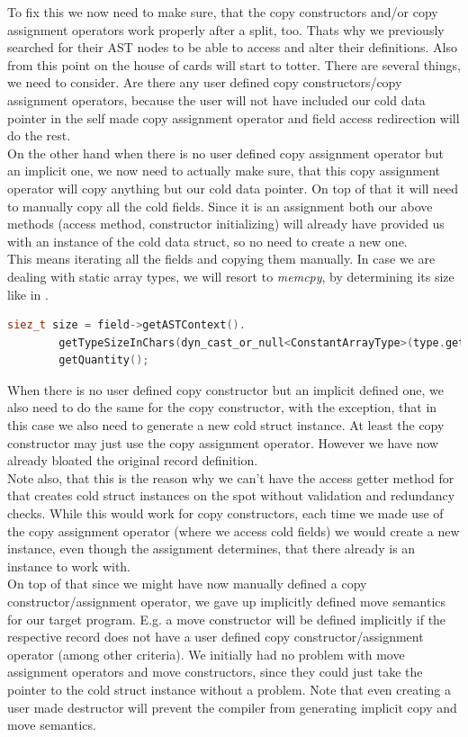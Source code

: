 To fix this we now need to make sure, that the copy constructors and/or copy assignment operators work properly after a split, too. Thats why we previously searched for their AST nodes to be able to access and alter their definitions. Also from this point on the house of cards will start to totter. There are several things, we need to consider. Are there any user defined copy constructors/copy assignment operators, because the user will not have included our cold data pointer in the self made copy assignment operator and field access redirection will do the rest.\\
On the other hand when there is no user defined copy assignment operator but an implicit one, we now need to actually make sure, that this copy assignment operator will copy anything but our cold data pointer. On top of that it will need to manually copy all the cold fields. Since it is an assignment both our above methods (access method, constructor initializing) will already have provided us with an instance of the cold data struct, so no need to create a new one.\\
This means iterating all the fields and copying them manually. In case we are dealing with static array types, we will resort to \textit{memcpy}, by determining its size like in .
\begin{lstlisting}[language=C++, name={Retrieving the size of a static array type through its AST node.}, label={memcpy_quant}]
	siez_t size = field->getASTContext().
		getTypeSizeInChars(dyn_cast_or_null<ConstantArrayType>(type.getTypePtr())).
		getQuantity();
\end{lstlisting}
When there is no user defined copy constructor but an implicit defined one, we also need to do the same for the copy constructor, with the exception, that in this case we also need to generate a new cold struct instance. At least the copy constructor may just use the copy assignment operator. However we have now already bloated the original record definition.\\
Note also, that this is the reason why we can't have the access getter method for that creates cold struct instances on the spot without validation and redundancy checks. While this would work for copy constructors, each time we made use of the copy assignment operator (where we access cold fields) we would create a new instance, even though the assignment determines, that there already is an instance to work with.\\
On top of that since we might have now manually defined a copy constructor/assignment operator, we gave up implicitly defined move semantics for our target program. E.g. a move constructor will be defined implicitly if the respective record does not have a user defined copy constructor/assignment operator  (among other criteria). We initially had no problem with move assignment operators and move constructors, since they could just take the pointer to the cold struct instance without a problem. Note that even creating a user made destructor will prevent the compiler from generating implicit copy and move semantics.\\
